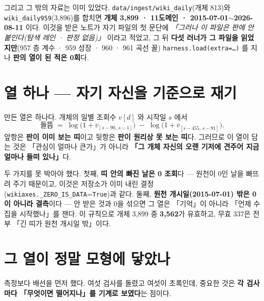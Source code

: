 \documentclass[10pt]{article}
\begin{document}

그리고 그 밖의 자료는 이미 있었다. \texttt{data/ingest/wiki\_daily}(개체 813)와
\texttt{wiki\_daily959}(3{,}896)를 합치면 \textbf{개체 3{,}899 · 11도메인 ·
2015-07-01$\sim$2026-08-11} 이다. 이것을 받은 노트가 자기 파일의 첫 문단에
\emph{「그러나 이 파일은 판에 안 붙인다(탐색 레인 · 판정 없음)」} 이라고 적었고,
그 뒤 \textbf{다섯 러너가 그 파일을 읽었지만}(957 층 계수 · 959 성장 · 960 · 961 곡선 꼴)
\texttt{harness.load(extra=\ldots)} 를 지나 \textbf{판의 열이 된 적은 0회}다.

\section{열 하나 --- 자기 자신을 기준으로 재기}

만든 열은 하나다. 개체의 일별 조회수 $v[d]$ 와 시작일 $s$ 에서
\[
\text{들뜸} \;=\; \log\!\big(1+\overline{v}_{[s-90,\,s-1]}\big)
              \;-\; \log\!\big(1+\overline{v}_{[s-455,\,s-91]}\big).
\]
앞항은 \textbf{판이 이미 보는 띠}이고 뒷항은 \textbf{판이 원리상 못 보는 띠}다.
그러므로 이 열이 담는 것은 「관심이 얼마나 큰가」가 아니라 \textbf{「그 개체 자신의
오랜 기저에 견주어 지금 얼마나 들떠 있나」}다.

두 가지를 못 박아야 했다. 첫째, \textbf{띠 안의 빠진 날은 0 조회}다 --- 원천이 0인
날을 빠뜨려 주기 때문이고, 이것은 저장소가 이미 내린 결정
(\texttt{wikiaxes.\_ZERO\_IS\_DATA}=\texttt{True})과 같다. 둘째, \textbf{원천
개시일(2015-07-01) 밖은 0이 아니라 결측}이다 --- 안 받은 것과 0을 섞으면 그 열은
「기억」이 아니라 「언제 수집을 시작했나」를 잰다. 이 규칙으로 개체 3{,}899 중
\textbf{3{,}562}가 유효하고, 무효 337은 전부 「긴 띠가 원천 개시일 밖」이다.

\section{그 열이 정말 모형에 닿았나}

측정보다 배선을 먼저 했다. 여섯 검사를 돌렸고 여섯이 초록인데, 중요한 것은
\textbf{각 검사마다 「무엇이면 떨어지나」를 기계로 보였다}는 점이다.
\end{document}
